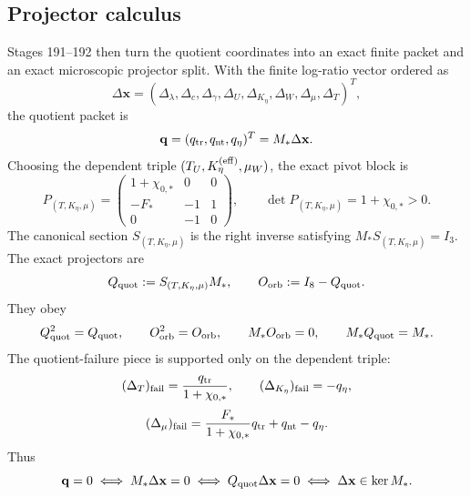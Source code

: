 \subsection{Projector calculus}
Stages 191--192 then turn the quotient coordinates into an exact finite packet and an exact microscopic projector split.  With the finite log-ratio vector ordered as
\begin{equation}
\label{eq:app-part05-finite-log-ratio-vector}
\Delta\mathbf x
=
(\Delta_\lambda,\Delta_c,\Delta_\gamma,\Delta_U,\Delta_{K_\eta},\Delta_W,\Delta_\mu,\Delta_T)^T,
\end{equation}
the quotient packet is
\begin{equation}
\label{eq:app-part05-q-packet}
\mathbf q
=
(q_{\rm tr},q_{\rm nt},q_\eta)^T
=M_*\Delta\mathbf x.
\end{equation}
Choosing the dependent triple \((T_U,K_\eta^{({\rm eff})},\mu_W)\), the exact pivot block is
\begin{equation}
\label{eq:app-part05-pivot-block}
P_{(T,K_\eta,\mu)}
=
\begin{pmatrix}
1+\chi_{0,*} & 0 & 0\\[4pt]
-F_* & -1 & 1\\[4pt]
0 & -1 & 0
\end{pmatrix},
\qquad
\det P_{(T,K_\eta,\mu)}=1+\chi_{0,*}>0.
\end{equation}
The canonical section \(S_{(T,K_\eta,\mu)}\) is the right inverse satisfying \(M_*S_{(T,K_\eta,\mu)}=I_3\).  The exact projectors are
\begin{equation}
\label{eq:app-part05-projectors}
Q_{\rm quot}:=S_{(T,K_\eta,\mu)}M_*,
\qquad
O_{\rm orb}:=I_8-Q_{\rm quot}.
\end{equation}
They obey
\begin{equation}
\label{eq:app-part05-projector-identities}
Q_{\rm quot}^2=Q_{\rm quot},
\qquad
O_{\rm orb}^2=O_{\rm orb},
\qquad
M_*O_{\rm orb}=0,
\qquad
M_*Q_{\rm quot}=M_*.
\end{equation}
The quotient-failure piece is supported only on the dependent triple:
\begin{equation}
\label{eq:app-part05-failure-components}
(\Delta_T)_{\rm fail}=\frac{q_{\rm tr}}{1+\chi_{0,*}},
\qquad
(\Delta_{K_\eta})_{\rm fail}=-q_\eta,
\end{equation}
\begin{equation}
\label{eq:app-part05-failure-mu-component}
(\Delta_\mu)_{\rm fail}
=
\frac{F_*}{1+\chi_{0,*}}q_{\rm tr}+q_{\rm nt}-q_\eta.
\end{equation}
Thus
\begin{equation}
\label{eq:app-part05-orbit-lock-projector}
\mathbf q=0
\iff
M_*\Delta\mathbf x=0
\iff
Q_{\rm quot}\Delta\mathbf x=0
\iff
\Delta\mathbf x\in\ker M_*.
\end{equation}

